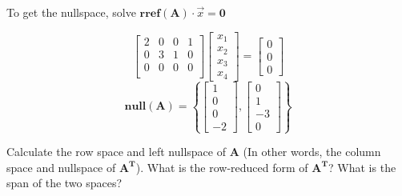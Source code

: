 \begin{enumerate}
{To get the nullspace, solve $\mathbf{rref(A)} \cdot \vec{x} = \mathbf{0}$

$$ \begin{bmatrix}
  2 & 0 & 0 & 1 \\
  0 & 3 & 1 & 0 \\
  0 & 0 & 0 & 0\\
 \end{bmatrix}
 \begin{bmatrix}
  x_1 \\
  x_2 \\
  x_3 \\
  x_4
 \end{bmatrix} = 
 \begin{bmatrix}
  0 \\
  0 \\
  0 
 \end{bmatrix}
 $$
$$ 
\mathbf{null(A) = }
\left\{
\begin{bmatrix}
1 \\ 0 \\ 0 \\ -2
\end{bmatrix}, 
\begin{bmatrix} 
0 \\ 1 \\ -3 \\ 0
\end{bmatrix}
\right \}
$$
}

\qitem Calculate the row space and left nullspace of $\mathbf{A}$ (In other words, the column space and nullspace of $\mathbf{A^T}$). What is the row-reduced form of $\mathbf{A^T}$? What is the span of the two spaces?


\end{enumerate}
